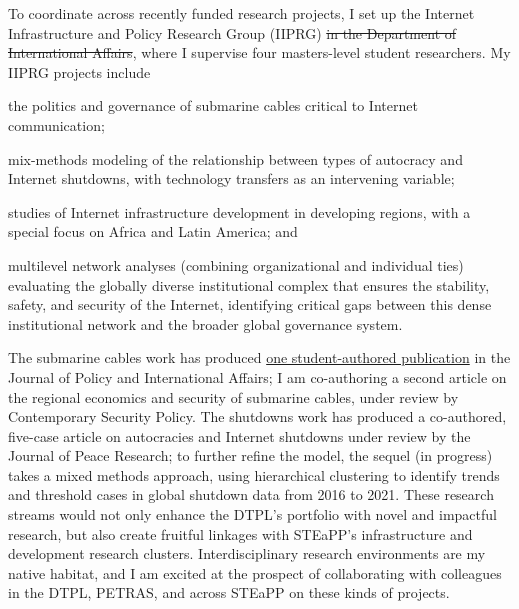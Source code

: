 \documentclass[11pt]{letter}
\begin{document}
\begin{letter}
To coordinate across recently funded research projects, I set up the Internet Infrastructure and Policy Research Group (IIPRG) \sout{in the Department of International Affairs}, where I supervise four masters-level student researchers.
%
My IIPRG projects include %
%
\begin{inparaenum}
  \item the politics and governance of submarine cables critical to Internet communication; 
  \item mix-methods modeling of the relationship between types of autocracy and Internet shutdowns, with technology transfers as an intervening variable; 
  \item studies of Internet infrastructure development in developing regions, with a special focus on Africa and Latin America; and 
  \item multilevel network analyses (combining organizational and individual ties) evaluating the globally diverse institutional complex that ensures the stability, safety, and security of the Internet, identifying critical gaps between this dense institutional network and the broader global governance system.
\end{inparaenum}  
%
The submarine cables work has produced \href{https://jpia.princeton.edu/news/leveraging-submarine-cables-political-gain-us-responses-chinese-strategy}{one student-authored publication} in the Journal of Policy and International Affairs; I am co-authoring a second article on the regional economics and security of submarine cables, under review by Contemporary Security Policy.
%
The shutdowns work has produced a co-authored, five-case article on autocracies and Internet shutdowns under review by the Journal of Peace Research; to further refine the model, the sequel (in progress) takes a mixed methods approach, using hierarchical clustering to identify trends and threshold cases in global shutdown data from 2016 to 2021. 
%
These research streams would not only enhance the DTPL's portfolio with novel and impactful research, but also create fruitful linkages with STEaPP's infrastructure and development research clusters.
%
Interdisciplinary research environments are my native habitat, and I am excited at the prospect of collaborating with colleagues in the DTPL, PETRAS, and across STEaPP on these kinds of projects.
% 
%



\end{letter}
\end{document}
